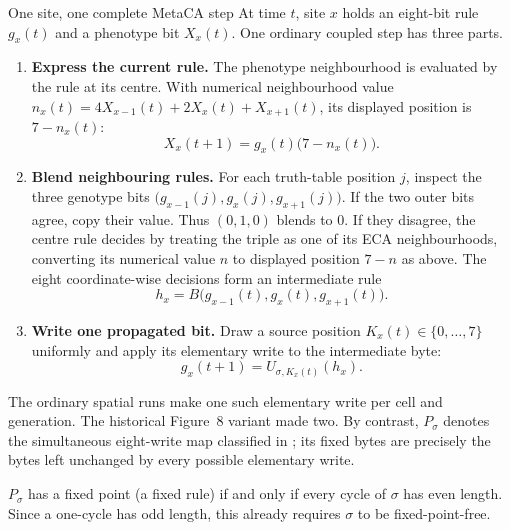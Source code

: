 \documentclass[man,12pt,floatsintext,donotrepeattitle]{apa7}
\newcommand{\sig}{\sigma}
\newcommand{\secref}[1]{\emph{\nameref{#1}}}
\begin{document}
\begin{workedexample}[label={box:metaca-step}]{One site, one complete MetaCA step}
\small
At time $t$, site $x$ holds an eight-bit rule $g_x(t)$ and a phenotype bit
$X_x(t)$. One ordinary coupled step has three parts.
\begin{enumerate}
\item \textbf{Express the current rule.} The phenotype neighbourhood is
evaluated by the rule at its centre. With numerical neighbourhood value
$n_x(t)=4X_{x-1}(t)+2X_x(t)+X_{x+1}(t)$, its displayed position is $7-n_x(t)$:
\[
X_x(t+1)=g_x(t)\bigl(7-n_x(t)\bigr).
\]
\item \textbf{Blend neighbouring rules.} For each truth-table position $j$,
inspect the three genotype bits
$\bigl(g_{x-1}(j),g_x(j),g_{x+1}(j)\bigr)$. If the two outer bits agree, copy
their value. Thus $(0,1,0)$ blends to $0$. If they disagree, the centre rule
decides by treating the triple as one of its ECA neighbourhoods, converting
its numerical value $n$ to displayed position $7-n$ as above. The eight
coordinate-wise decisions form an intermediate rule
\[
h_x=B\bigl(g_{x-1}(t),g_x(t),g_{x+1}(t)\bigr).
\]
\item \textbf{Write one propagated bit.} Draw a source position
$K_x(t)\in\{0,\ldots,7\}$ uniformly and apply its elementary write to the
intermediate byte:
\[
g_x(t+1)=U_{\sig,K_x(t)}(h_x).
\]
\end{enumerate}
The ordinary spatial runs make one such elementary write per cell and
generation. The historical Figure~8 variant made two. By contrast,
$P_\sig$ denotes the simultaneous eight-write map classified in
\secref{sec:classification}; its fixed bytes are precisely the bytes left
unchanged by every possible elementary write.
\end{workedexample}

\begin{theorem}[label={thm:parity}]
$P_\sig$ has a fixed point (a fixed rule) if and only if every cycle of
$\sig$ has even length. Since a one-cycle has odd length, this already
requires $\sig$ to be fixed-point-free.
\end{theorem}
\end{document}
